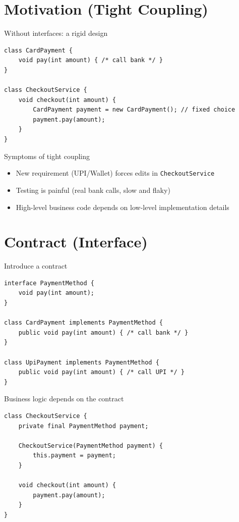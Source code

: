 \documentclass{beamer}
\begin{document}
\section{Motivation (Tight Coupling)}
\label{sec:motivation}

\begin{frame}[fragile]{Without interfaces: a rigid design}
\begin{lstlisting}
class CardPayment {
    void pay(int amount) { /* call bank */ }
}

class CheckoutService {
    void checkout(int amount) {
        CardPayment payment = new CardPayment(); // fixed choice
        payment.pay(amount);
    }
}
\end{lstlisting}
\end{frame}

\begin{frame}{Symptoms of tight coupling}
  \begin{itemize}[<+->]
    \item New requirement (UPI/Wallet) forces edits in \texttt{CheckoutService}
    \item Testing is painful (real bank calls, slow and flaky)
    \item High-level business code depends on low-level implementation details
  \end{itemize}
\end{frame}

\section{Contract (Interface)}
\label{sec:contract}

\begin{frame}[fragile]{Introduce a contract}
\begin{lstlisting}
interface PaymentMethod {
    void pay(int amount);
}

class CardPayment implements PaymentMethod {
    public void pay(int amount) { /* call bank */ }
}

class UpiPayment implements PaymentMethod {
    public void pay(int amount) { /* call UPI */ }
}
\end{lstlisting}
\end{frame}

\begin{frame}[fragile]{Business logic depends on the contract}
\begin{lstlisting}
class CheckoutService {
    private final PaymentMethod payment;

    CheckoutService(PaymentMethod payment) {
        this.payment = payment;
    }

    void checkout(int amount) {
        payment.pay(amount);
    }
}
\end{lstlisting}
\end{frame}
\end{document}

